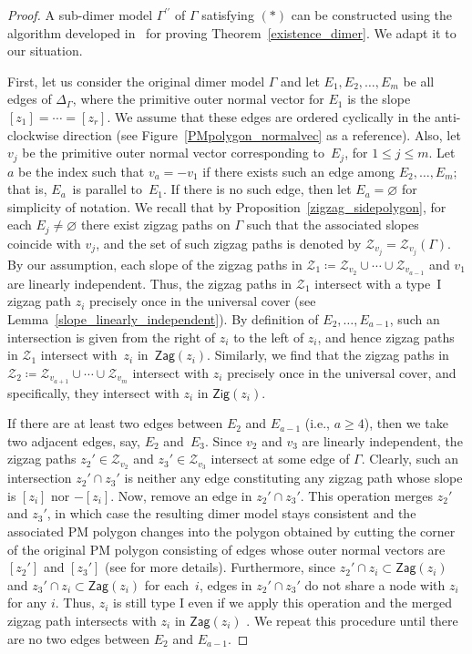 \documentclass[pdftex]{sigma}%
\numberwithin{equation}{section}
\numberwithin{figure}{section}
\numberwithin{table}{section}
\newcommand{\calZ}{\mathcal{Z}}
\newcommand{\Zig}{\mathsf{Zig}}
\newcommand{\Zag}{\mathsf{Zag}}
\begin{document}
\begin{proof}
A sub-dimer model $\Gamma^{\prime \prime}$ of $\Gamma$ satisfying $(*)$ can be constructed using
the algorithm developed in~\cite{Gul,IU2} for proving Theorem~\ref{existence_dimer}.
We adapt it to our situation.

First, let us consider the original dimer model $\Gamma$ and let $E_1,E_2,\dots,E_m$ be all edges of $\Delta_\Gamma$, where the primitive outer normal vector for $E_1$ is the slope $[z_1]=\cdots=[z_r]$.
We assume that these edges are ordered cyclically in the anti-clockwise direction (see Figure~\ref{PMpolygon_normalvec} as a reference).
Also, let $v_j$ be the primitive outer normal vector corresponding to~$E_j$, for $1 \leq j \leq m$.
Let~$a$ be the index such that $v_a=-v_1$ if there exists such an edge among $E_2,\dots,E_m$; that is, $E_a$~is parallel to~$E_1$.
If there is no such edge, then let $E_a= \varnothing$ for simplicity of notation.
We recall that by Proposition~\ref{zigzag_sidepolygon}, for each $E_j\neq\varnothing$ there exist zigzag paths on $\Gamma$ such that the associated slopes coincide with $v_j$, and the set of such zigzag paths is denoted by $\calZ_{v_j}=\calZ_{v_j}(\Gamma)$.
By our assumption, each slope of the zigzag paths in $\calZ_1\coloneqq\calZ_{v_2}\cup\cdots\cup\calZ_{v_{a-1}}$ and $v_1$ are linearly independent.
Thus, the zigzag paths in $\calZ_1$ intersect with a type~I zigzag path $z_i$ precisely once in the universal cover (see Lemma~\ref{slope_linearly_independent}).
By definition of $E_2,\dots,E_{a-1}$, such an intersection is given from the right of $z_i$ to the left of $z_i$,
and hence zigzag paths in $\calZ_1$ intersect with~$z_i$ in~$\Zag(z_i)$.
Similarly, we find that the zigzag paths in $\calZ_2\coloneqq\calZ_{v_{a+1}}\cup\cdots\cup\calZ_{v_m}$ intersect with $z_i$ precisely once in the universal cover, and specifically, they intersect with $z_i$ in $\Zig(z_i)$.

If there are at least two edges between $E_2$ and $E_{a-1}$ (i.e., $a \geq 4$),
then we take two adjacent edges, say, $E_2$ and~$E_3$.
Since $v_2$ and $v_3$ are linearly independent, the zigzag paths $z_2'\in\calZ_{v_2}$ and $z_3'\in\calZ_{v_3}$ intersect at some edge of $\Gamma$.
Clearly, such an intersection $z_2' \cap z_3'$ is neither any edge constituting any zigzag path whose slope is $[z_i]$ nor $-[z_i]$.
Now, remove an edge in $z_2' \cap z_3'$. This operation merges $z_2'$ and $z_3'$, in which case the resulting dimer model stays consistent and the associated PM polygon
changes into the polygon obtained by cutting the corner of the original PM polygon consisting of edges whose outer normal vectors are $[z_2']$ and $[z_3']$
(see \cite[Sections~5 and 6]{Gul} for more details).
Furthermore, since $z_2' \cap z_i \subset \Zag(z_i)$ and $z_3' \cap z_i \subset \Zag(z_i)$ for each~$i$, edges in $z_2' \cap z_3'$ do not share a node with $z_i$ for any $i$.
Thus, $z_i$ is still type I even if we apply this operation and the merged zigzag path intersects with $z_i$ in $\Zag(z_i)$ .
We repeat this procedure until there are no two edges between $E_2$ and $E_{a-1}$.


\end{proof}
\end{document}
